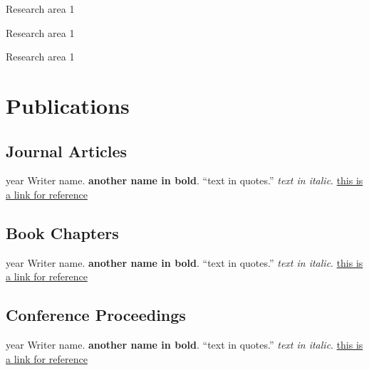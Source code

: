 \documentclass[12pt,letterpaper]{report}
\newcommand{\listitemspace}{0.25em}
\renewenvironment{itemize}
{\begin{list}{}{\setlength{\leftmargin}{0em}
                \setlength{\parskip}{0em}
                \setlength{\itemsep}{\listitemspace}
                \setlength{\parsep}{\listitemspace}}}
{\end{list}}
\begin{document}
    \begin{itemize}

        \item Research area 1
        \item Research area 1
        \item Research area 1

    \end{itemize}



    \section*{Publications}

    \subsection*{Journal Articles}

    \begin{tablist}

        \item[year] \tab{}Writer name. \textbf{another name in bold}. \enquote{text in quotes.} \textit{text in italic}. \href{https://this.is.a.link}{this is a link for reference}

    \end{tablist}



    \subsection*{Book Chapters}

    \begin{tablist}

        \item[year] \tab{}Writer name. \textbf{another name in bold}. \enquote{text in quotes.} \textit{text in italic}. \href{https://this.is.a.link}{this is a link for reference}

    \end{tablist}



    \subsection*{Conference Proceedings}

    \begin{tablist}

        \item[year] \tab{}Writer name. \textbf{another name in bold}. \enquote{text in quotes.} \textit{text in italic}. \href{https://this.is.a.link}{this is a link for reference}

    \end{tablist}
\end{document}

